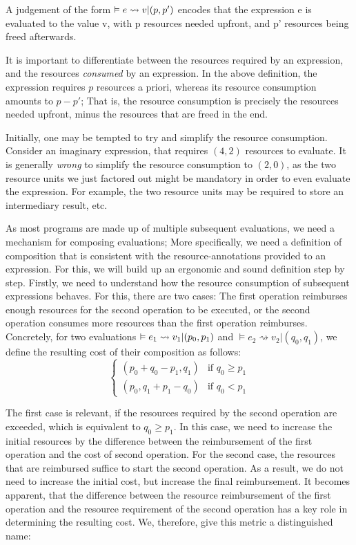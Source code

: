 \begin{definition}
   A judgement of the form \(\vDash e \rightsquigarrow v | (p, p')\) encodes that the expression e is evaluated to the value v, with p resources needed upfront, and p' resources being freed afterwards.
\end{definition}

It is important to differentiate between the resources required by an expression, and the resources \emph{consumed} by an expression. In the above definition, the expression requires \(p\) resources a priori, whereas its resource consumption amounts to \(p - p'\); That is, the resource consumption is precisely the resources needed upfront, minus the resources that are freed in the end.

Initially, one may be tempted to try and simplify the resource consumption. Consider an imaginary expression, that requires \((4, 2)\) resources to evaluate. It is generally \emph{wrong} to simplify the resource consumption to \((2, 0)\), as the two resource units we just factored out might be mandatory in order to even evaluate the expression. For example, the two resource units may be required to store an intermediary result, etc. 

As most programs are made up of multiple subsequent evaluations, we need a mechanism for composing evaluations; More specifically, we need a definition of composition that is consistent with the resource-annotations provided to an expression.
For this, we will build up an ergonomic and sound definition step by step. Firstly, we need to understand how the resource consumption of subsequent expressions behaves. For this, there are two cases: The first operation reimburses enough resources for the second operation to be executed, or the second operation consumes more resources than the first operation reimburses. Concretely, for two evaluations \( \vDash e_1 \rightsquigarrow v_1 | (p_0, p_1)\) and \( \vDash e_2 \rightsquigarrow v_2 | (q_0, q_1)\), we define the resulting cost of their composition as follows:
\begin{equation}
   \label{def:multiplying-resources}
   \begin{cases}
      (p_0 + q_0 - p_1, q_1) & \mbox{if } q_0 \geq p_1 \\
      (p_0, q_1 + p_1 - q_0) & \mbox{if } q_0 <    p_1 
   \end{cases}
\end{equation}

The first case is relevant, if the resources required by the second operation are exceeded, which is equivalent to \(q_0 \geq p_1\). In this case, we need to increase the initial resources by the difference between the reimbursement of the first operation and the cost of second operation. For the second case, the resources that are reimbursed suffice to start the second operation. As a result, we do not need to increase the initial cost, but increase the final reimbursement. It becomes apparent, that the difference between the resource reimbursement of the first operation and the resource requirement of the second operation has a key role in determining the resulting cost. We, therefore, give this metric a distinguished name:

